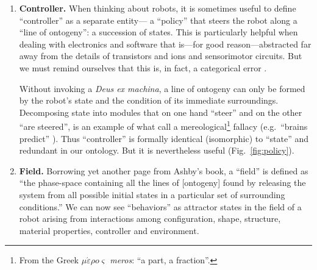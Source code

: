 \begin{enumerate}
    
    \item \textbf{Controller.}
    When thinking about robots, it is sometimes useful to define ``controller'' as a separate entity---%
    a ``policy'' \cite{sutton2018reinforcement}
    that steers the robot along a ``line of ontogeny'': a succession of states.
    This is particularly helpful when dealing with electronics and software that is---for good reason---abstracted far away from the details of transistors and ions and sensorimotor circuits.
    But we must remind ourselves that this is, in fact, a categorical error \cite{dreyfus1967computers,harvey2000robotics,pfeifer2006body}.
    
    Without invoking a \textit{Deus ex machina}, a line of ontogeny can only be formed by the robot's state and the condition of its immediate surroundings.
    Decomposing state into modules that on one hand ``steer'' and on the other ``are steered'', is an example of what \citet{bennett2003philosophical} call a mereological\footnote{%
    From the Greek $\mu\acute{\varepsilon}\rho{o}\varsigma$ %
    \textit{meros}: ``a part, a fraction''.
    } 
    fallacy (e.g.~``brains predict'' \cite{clark2013whatever}).
    Thus ``controller'' is formally identical (isomorphic) to ``state'' and redundant in our ontology.
    But it is nevertheless
    useful (Fig.~\ref{fig:policy}).
    
    
    \item \textbf{Field.}
    Borrowing yet another page from Ashby's book, a ``field'' is defined as ``the phase-space containing all the lines of [ontogeny] found by releasing the system from all possible initial states in a particular set of surrounding conditions.''
    We can now see ``behaviors'' as attractor states in the field of a robot arising from interactions among configuration, shape, structure, material properties, 
    controller 
    and environment.


\end{enumerate}
